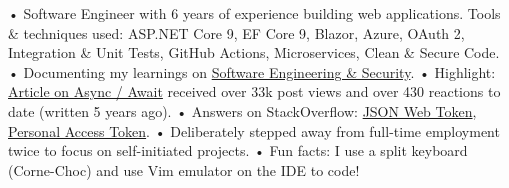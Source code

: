 

\begin{cvparagraph}

• Software Engineer with 6 years of experience building web applications. Tools \& techniques used: ASP.NET Core 9, EF Core 9, Blazor, Azure, OAuth 2, Integration \& Unit Tests, GitHub Actions, Microservices, Clean \& Secure Code.
\newline
• Documenting my learnings on \href{https://bit.ly/zy-blog}{Software Engineering \& Security}.
\newline
• Highlight: \href{https://bit.ly/zy-async}{Article on Async / Await} received over 33k post views and over 430 reactions to date (written 5 years ago).
\newline
• Answers on StackOverflow: \href{https://bit.ly/zy-jwt}{JSON Web Token}, \href{https://bit.ly/zy-pat}{Personal Access Token}.
\newline
• Deliberately stepped away from full-time employment twice to focus on self-initiated projects.
\newline
• Fun facts: I use a split keyboard (Corne-Choc) and use Vim emulator on the IDE to code!
\end{cvparagraph}